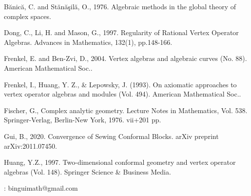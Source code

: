 \documentclass[12pt,a4paper,notitlepage]{article}
\theoremstyle{definition}
\theoremstyle{plain}
\numberwithin{equation}{section}
\begin{document}
\printindex	
	\begin{thebibliography}{999999}
		\footnotesize	
		
		
		
		


Bănică, C. and Stănăşilă, O., 1976. Algebraic methods in the global theory of complex spaces.


Dong, C., Li, H. and Mason, G., 1997. Regularity of Rational Vertex Operator Algebras. Advances in Mathematics, 132(1), pp.148-166.



Frenkel, E. and Ben-Zvi, D., 2004. Vertex algebras and algebraic curves (No. 88). American Mathematical Soc..


Frenkel, I., Huang, Y. Z., \& Lepowsky, J. (1993). On axiomatic approaches to vertex operator algebras and modules (Vol. 494). American Mathematical Soc..




Fischer, G., Complex analytic geometry. Lecture Notes in Mathematics, Vol. 538. Springer-Verlag, Berlin-New York, 1976. vii+201 pp.



Gui, B., 2020. Convergence of Sewing Conformal Blocks. arXiv preprint arXiv:2011.07450.

Huang, Y.Z., 1997. Two-dimensional conformal geometry and vertex operator algebras (Vol. 148). Springer Science \& Business Media.


		
		
		
		
		
	\end{thebibliography}
	
	: binguimath@gmail.com
\end{document}
